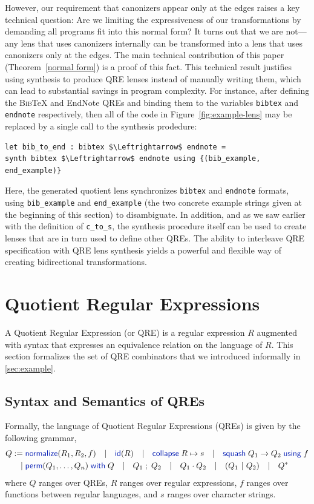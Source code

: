 \documentclass[acmsmall,screen]{acmart}
\newcommand{\kw}[1]{\textcolor{dkblue}{\ensuremath{\mathsf{#1}}}}
\newcommand{\collapse}[2]{\ensuremath{\kw{collapse} \; #1 \mapsto #2}}
\newcommand{\squash}[3]{\ensuremath{\kw{squash} \; #1 \rightarrow #2\; \kw{using} \; #3}}
\newcommand{\perm}[2]{\ensuremath{\kw{perm}(#1)\; \kw{with}\; #2}}
\newcommand{\normalize}[3]{\ensuremath{\kw{normalize}(#1, #2, #3)}}
\newcommand{\sep}{\ensuremath{\ | \ }}
\newcommand{\bibtex}{\textsc{Bib}\TeX{}}
\newcommand{\semicolon}{\ensuremath{\; ; \;}}
\newcommand{\id}{\ensuremath{\kw{id}}}
\newcommand{\bsep}{\ \ \sep{} \ \ }
\newcommand{\cd}[1]{\lstinline[backgroundcolor=\color{white}]$#1$}
\begin{document}
However, our requirement that canonizers appear only at the edges
raises a key technical question: Are we limiting the expressiveness of
our transformations by demanding all programs fit into this normal
form?  It turns out that we are not---any lens that uses canonizers
internally can be transformed into a lens that uses canonizers only at
the edges. The main technical contribution of this paper
(Theorem~\ref{normal form})
is a proof of this fact.
This technical result justifies 
using synthesis to produce QRE lenses instead of manually writing
them,
which can lead to substantial savings in program complexity.
For instance, after defining the \bibtex{} and EndNote QREs and
binding them to the variables \cd{bibtex} and \cd{endnote} respectively, then
all of the code in Figure~\ref{fig:example-lens} may be replaced by a single call
to the synthesis prodedure:
\begin{lstlisting}
let bib_to_end : bibtex $\Leftrightarrow$ endnote =
synth bibtex $\Leftrightarrow$ endnote using {(bib_example, end_example)}
\end{lstlisting}
\noindent 
Here, the generated quotient lens synchronizes \cd{bibtex} and
\cd{endnote} formats, using \cd{bib_example} and \cd{end_example} (the two
concrete example strings given at the beginning of this section) to
disambiguate. In addition, and as we saw earlier with the definition of
\cd{c_to_s}, the synthesis procedure itself can be used to create lenses that
are in turn used to define other QREs.  The ability to interleave QRE
specification with QRE lens synthesis yields a powerful and flexible way of
creating bidirectional transformations.

\section{Quotient Regular Expressions}
\label{QRE}
A Quotient Regular Expression (or QRE) is a regular expression $R$ augmented
with syntax that expresses an equivalence relation on the language of $R$. This
section formalizes the set of QRE combinators that we introduced informally
in \cref{sec:example}.

\subsection{Syntax and Semantics of QREs}
Formally, the language of Quotient Regular Expressions (QREs) is given by the
following grammar,
\begin{align*}
Q := \; & \normalize{R_1}{R_2}{f} \bsep{} \id(R) \bsep \collapse{R}{s} \bsep
\squash{Q_1}{Q_2}{f} \\ | \; & \perm{Q_1, \ldots, Q_n}{Q} \bsep Q_1 \semicolon
Q_2 \bsep Q_1 \cdot Q_2 \bsep (Q_1 \sep Q_2) \bsep Q^*
\end{align*}
where $Q$ ranges over QREs, 
$R$ ranges over regular expressions, 
$f$ ranges over functions between regular languages, and 
$s$ ranges over character strings.
\end{document}
